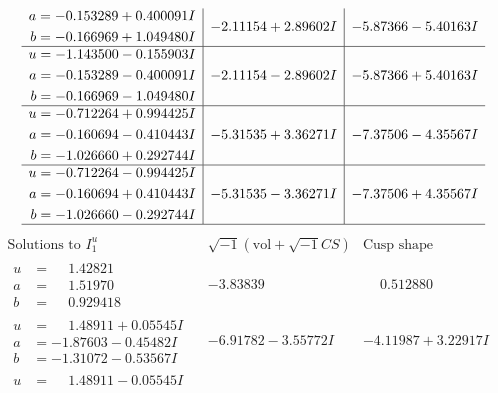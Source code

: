 \documentclass[1p]{elsarticle_modified}
\theoremstyle{definition}
\newcommand{\I}{\sqrt{-1}}
\begin{document}
$$\begin{array}{c|c|c}
\begin{aligned}
a &= -0.153289 + 0.400091 I \\
b &= -0.166969 + 1.049480 I\end{aligned}
 & -2.11154 + 2.89602 I & -5.87366 - 5.40163 I \\ \hline\begin{aligned}
u &= -1.143500 - 0.155903 I \\
a &= -0.153289 - 0.400091 I \\
b &= -0.166969 - 1.049480 I\end{aligned}
 & -2.11154 - 2.89602 I & -5.87366 + 5.40163 I \\ \hline\begin{aligned}
u &= -0.712264 + 0.994425 I \\
a &= -0.160694 - 0.410443 I \\
b &= -1.026660 + 0.292744 I\end{aligned}
 & -5.31535 + 3.36271 I & -7.37506 - 4.35567 I \\ \hline\begin{aligned}
u &= -0.712264 - 0.994425 I \\
a &= -0.160694 + 0.410443 I \\
b &= -1.026660 - 0.292744 I\end{aligned}
 & -5.31535 - 3.36271 I & -7.37506 + 4.35567 I\\
 \hline 
 \end{array}$$\newpage$$\begin{array}{c|c|c}  
\text{Solutions to }I^u_{1}& \I (\text{vol} + \sqrt{-1}CS) & \text{Cusp shape}\\
 \hline 
\begin{aligned}
u &= \phantom{-}1.42821\phantom{ +0.000000I} \\
a &= \phantom{-}1.51970\phantom{ +0.000000I} \\
b &= \phantom{-}0.929418\phantom{ +0.000000I}\end{aligned}
 & -3.83839\phantom{ +0.000000I} & \phantom{-}0.512880\phantom{ +0.000000I} \\ \hline\begin{aligned}
u &= \phantom{-}1.48911 + 0.05545 I \\
a &= -1.87603 - 0.45482 I \\
b &= -1.31072 - 0.53567 I\end{aligned}
 & -6.91782 - 3.55772 I & -4.11987 + 3.22917 I \\ \hline\begin{aligned}
u &= \phantom{-}1.48911 - 0.05545 I \\

\end{aligned}
\end{array}$$
\end{document}
